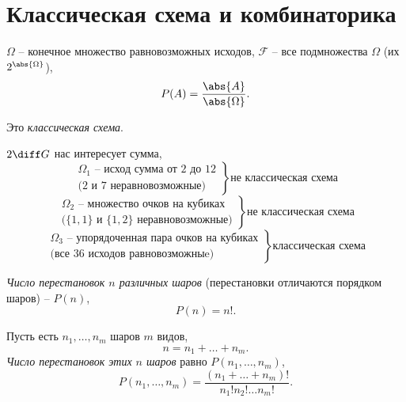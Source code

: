 

\section{Классическая схема и комбинаторика}

\begin{definition}
  $\Omega$ -- конечное множество равновозможных исходов, $\mathcal{F}$ -- все подмножества $\Omega$ (их $2^{\abs{\Omega}}$),
  \[
    P(A) = \frac{\abs{A}}{\abs{\Omega}}.
  \]

  Это \emph{классическая схема}.
\end{definition}

\begin{eg}
  $2 \diff G$ нас интересует сумма,
  \[
    \left.\begin{array}{c}
      \Omega_{1} \text{ -- исход сумма от 2 до 12} \\
      \text{(2 и 7 неравновозможные)}
    \end{array}\right\} \text{не классическая схема}
  \]
  \[
    \left.\begin{array}{c}
      \Omega_{2} \text{ -- множество очков на кубиках} \\
      \text{($\{1,1\}$ и $\{1,2\}$ неравновозможные)}
    \end{array}\right\} \text{не классическая схема}
  \]
  \[
    \left.\begin{array}{c}
      \Omega_{3} \text{ -- упорядоченная пара очков на кубиках} \\
      \text{(все 36 исходов равновозможныe)}
    \end{array}\right\} \text{классическая схема}
  \]
\end{eg}

\begin{definition}
  \emph{Число перестановок $n$ различных шаров} (перестановки отличаются порядком шаров) -- $P(n)$,
  \[
    P(n) = n!.
  \]
\end{definition}

\begin{definition}
  Пусть есть $n_1,\ldots,n_m$ шаров $m$ видов,
  \[
    n = n_1 + \ldots + n_m.
  \]
  \emph{Число перестановок этих $n$ шаров} равно $P(n_1,\ldots,n_m)$,
  \[
    P(n_1,\ldots,n_m) = \frac{(n_1+\ldots+n_m)!}{n_1!n_2!\ldots n_m!}.
  \]
\end{definition}

